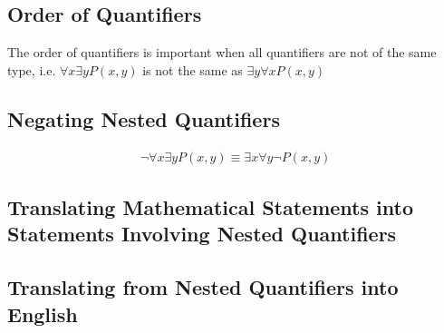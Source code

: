 \documentclass[12pt letter]{report}
\begin{document}
\subsection{Order of Quantifiers}

The order of quantifiers is important when all quantifiers are not of the same type, i.e. $\forall x \exists y P \left( x, y \right) $ is not the same as $\exists y \forall x P \left( x, y \right) $

\subsection{Negating Nested Quantifiers}

\begin{align*}
	\neg  \forall x \exists y P \left( x, y \right) \equiv \exists x \forall y \neg P \left( x, y \right) \tag*{
		By De Morgan's Law
	}
\end{align*}

\subsection{Translating Mathematical Statements into Statements Involving Nested Quantifiers}



\subsection{Translating from Nested Quantifiers into English}
\end{document}
